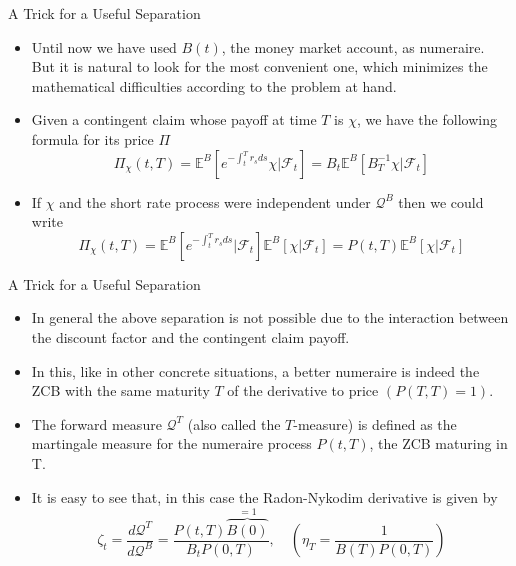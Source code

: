 \documentclass{beamer}
\begin{document}
\begin{frame}{A Trick for a Useful Separation}
	\begin{itemize}
	\item Until now we have used $B(t)$, the money market account, as numeraire. But it is natural to look for the most convenient one, which minimizes the mathematical difficulties according to the problem at hand.
	\item Given a contingent claim whose payoff at time $T$ is $\chi$, we have the following formula for its price $\Pi$
	\begin{equation*}
	\Pi_\chi(t,T)=\mathbb{E}^B\left[e^{-\int_t^T r_s ds}\chi\bigg|\mathcal{F}_t \right]=B_t\mathbb{E}^B\left[B^{-1}_T\chi|\mathcal{F}_t\right]
	\end{equation*}
	\item If $\chi$ and the short rate process were independent under $\mathcal{Q}^B$ then we could write
	\begin{equation*}
	\Pi_\chi(t,T)=\mathbb{E}^B\left[e^{-\int_t^T r_s ds}\bigg|\mathcal{F}_t\right]\mathbb{E}^B\left[\chi|\mathcal{F}_t\right] = P(t,T)\mathbb{E}^B\left[\chi|\mathcal{F}_t\right]
	\end{equation*}
	\end{itemize}
\end{frame}

\begin{frame}{A Trick for a Useful Separation}
	\begin{itemize}
		\item In general the above separation is not possible due to the interaction between the discount factor and the contingent claim payoff. 
		\item In this, like in other concrete situations, a better numeraire is indeed the ZCB with the same maturity $T$ of the derivative to price $(P(T,T)=1)$.
		\item The forward measure $\mathcal{Q}^T$ (also called the $T$-measure) is defined as the martingale measure for the numeraire process $P(t,T)$, the ZCB maturing in T.
		\item It is easy to see that, in this case the Radon-Nykodim derivative is given by
		\begin{equation}
			\zeta_t = \frac{d\mathcal{Q}^T}{d\mathcal{Q}^B} = \frac{P(t,T)\overbrace{B(0)}^{=1}}{B_t P(0,T)} ,\quad\left(\eta_T=\frac{1}{B(T)P(0,T)}\right)
		\label{eq:radon_nikodym_t_forward}
		\end{equation}
	\end{itemize}
\end{frame}
\end{document}
